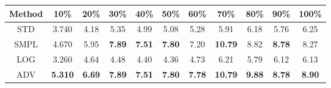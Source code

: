 \documentclass{standalone}
\begin{document}
\begin{tabular}{c|cccccccccc}
      \toprule
      Method & 10\% & 20\% & 30\% & 40\% & 50\% & 60\% & 70\% & 80\% & 90\% & 100\% \\
      \midrule
STD & 3.740 & 4.18 & 5.35 & 4.99 & 5.08 & 5.28 & 5.91 & 6.18 & 5.76 & 6.25\\
SMPL & 4.670 & 5.95 & \textbf{7.89} & \textbf{7.51} & \textbf{7.80} & 7.20 & \textbf{10.79} & 8.82 & \textbf{8.78} & 8.27\\
LOG & 3.260 & 4.64 & 4.48 & 4.40 & 4.36 & 4.73 & 6.21 & 5.79 & 6.12 & 6.13\\
ADV & \textbf{5.310} & \textbf{6.69} & \textbf{7.89} & \textbf{7.51} & \textbf{7.80} & \textbf{7.78} & \textbf{10.79} & \textbf{9.88} & \textbf{8.78} & \textbf{8.90}\\
  \bottomrule
\end{tabular}
\end{document}
